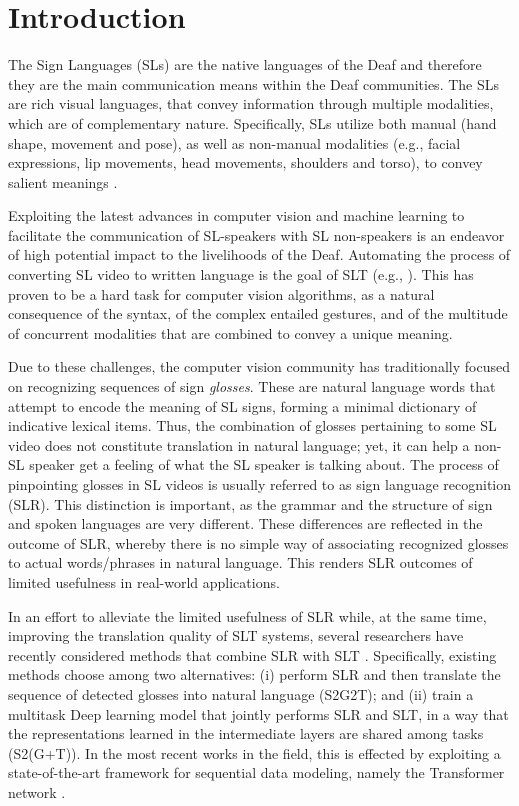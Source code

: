 \documentclass[10pt,twocolumn,letterpaper]{article}
\begin{document}
\section{Introduction}
\label{sec:intro}

The Sign Languages (SLs) are the native languages of the Deaf and therefore they are the main communication means within the Deaf communities. The SLs are rich visual languages, that convey information through  multiple modalities, which are of complementary nature. Specifically, SLs utilize both manual (hand shape, movement and pose), as well as non-manual modalities (e.g., facial expressions, lip movements, head movements, shoulders and torso), to convey salient meanings \cite{Quer2017}.

Exploiting the latest advances in computer vision and machine learning to facilitate the communication of SL-speakers with SL non-speakers is an endeavor of high potential impact to the livelihoods of the Deaf. Automating the process of converting SL video to written language is the goal of SLT (e.g., \cite{Camgoz18,Camgoz20,CamgozKHB20b,yin2020,Orbay2020,partaourides2020variational}). This has proven to be a hard task for computer vision algorithms, as a natural consequence of the syntax, of the complex entailed  gestures, and of the multitude of concurrent modalities that are combined to convey a unique meaning. 

Due to these challenges, the computer vision community has traditionally focused on recognizing  sequences of sign \emph{glosses}. These are natural language words that attempt to encode the meaning of SL signs, forming a minimal dictionary of indicative lexical items. Thus, the combination of glosses pertaining to some SL video does not constitute translation in natural language; yet, it can help a non-SL speaker get a feeling of what the SL speaker is talking about. The process of pinpointing glosses in SL videos is usually referred to as sign language recognition (SLR). This distinction is important, as the grammar and the structure of sign and spoken languages are very different. These differences are reflected in the outcome of SLR, whereby there is no simple way of associating recognized glosses to actual words/phrases in natural language. This renders SLR outcomes of limited usefulness in real-world applications. 

In an effort to alleviate the limited usefulness of SLR while, at the same time, improving the translation quality of SLT systems, several researchers have recently considered methods that combine SLR with SLT \cite{Camgoz18, Camgoz20, yin2020, CamgozKHB20b}. Specifically, existing methods choose among two alternatives: (i) perform SLR and then translate the sequence  of detected  glosses into natural language (S2G2T); and (ii) train a multitask Deep learning model that jointly performs SLR and SLT, in a way that the representations learned in the intermediate layers  are shared among tasks (S2(G+T)). In the most recent works in the field, this is effected by exploiting a state-of-the-art framework for sequential data modeling, namely the Transformer network \cite{Vaswani2017}.
\end{document}
